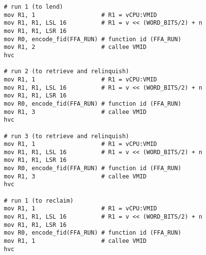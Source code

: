 \documentclass{article}
\begin{document}
\begin{lstlisting}[caption={VM 0}]
# run 1 (to lend)
mov R1, 1                   # R1 = vCPU:VMID
mov R1, R1, LSL 16          # R1 = v << (WORD_BITS/2) + n
mov R1, R1, LSR 16
mov R0, encode_fid(FFA_RUN) # function id (FFA_RUN)
mov R1, 2                   # callee VMID
hvc

# run 2 (to retrieve and relinquish)
mov R1, 1                   # R1 = vCPU:VMID
mov R1, R1, LSL 16          # R1 = v << (WORD_BITS/2) + n
mov R1, R1, LSR 16
mov R0, encode_fid(FFA_RUN) # function id (FFA_RUN)
mov R1, 3                   # callee VMID
hvc

# run 3 (to retrieve and relinquish)
mov R1, 1                   # R1 = vCPU:VMID
mov R1, R1, LSL 16          # R1 = v << (WORD_BITS/2) + n
mov R1, R1, LSR 16
mov R0, encode_fid(FFA_RUN) # function id (FFA_RUN)
mov R1, 3                   # callee VMID
hvc

# run 1 (to reclaim)
mov R1, 1                   # R1 = vCPU:VMID
mov R1, R1, LSL 16          # R1 = v << (WORD_BITS/2) + n
mov R1, R1, LSR 16
mov R0, encode_fid(FFA_RUN) # function id (FFA_RUN)
mov R1, 1                   # callee VMID
hvc
\end{lstlisting}
\end{document}
